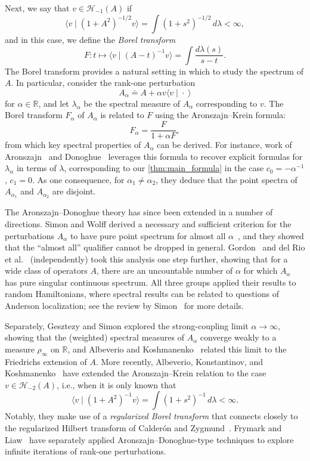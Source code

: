 \documentclass{cams-l} %
\newcommand{\dave}[1]{#1}\newcommand{\davebegin}{}\newcommand{\daveend}{}\newcommand{\george}[1]{#1}
\newcommand{\RR}{\mathbb R}
\newcommand{\cH}{\mathcal H}
\theoremstyle{definition}
\theoremstyle{remark}
\numberwithin{equation}{section}
\begin{document}
\dave{Next, we say that $v\in\cH_{-1}(A)$ if 
\[\langle v\;|\;(1 + A^2)^{-1/2}v\rangle = \int (1+s^2)^{-1/2}\,d\lambda < \infty,\]
and in this case, we define the \emph{Borel transform}
\[F:t\mapsto \langle v\;|\;(A-t)^{-1}v\rangle = \int\frac{d\lambda(s)}{s-t}.\]}
The Borel transform provides a natural setting in which to study the spectrum of $A$. In particular, consider the rank-one perturbation
\[A_\alpha\doteq A + \alpha v\langle v\;|\;\cdot\;\rangle\]
for $\alpha\in\RR$, and let $\lambda_\alpha$ be the spectral measure of $A_\alpha$ corresponding to $v$. The Borel transform $F_\alpha$ of $A_\alpha$ is related to $F$ using the Aronszajn--Krein formula:
\[F_\alpha = \frac{F}{1+\alpha F},\]
from which key spectral properties of $A_\alpha$ can be derived. For instance, work of Aronszajn~\cite{e48c169e-0374-3786-a618-5e3861c40257} and Donoghue~\cite{https://doi.org/10.1002/cpa.3160180402} leverages this formula to recover explicit formulas for $\lambda_\alpha$ in terms of $\lambda$, corresponding to our \cref{thm:main_formula} in the case $c_0=-\alpha^{-1}$, $c_1=0$. As one consequence, for $\alpha_1\neq\alpha_2$, they deduce that the point spectra of $A_{\alpha_1}$ and $A_{\alpha_2}$ are disjoint.

The Aronszajn--Donoghue theory has since been extended in a number of directions. Simon and Wolff derived a necessary and sufficient criterion for the perturbations $A_\alpha$ to have pure point spectrum for almost all $\alpha$~\cite{Simon1986SingularCS}, and they showed that the ``almost all'' qualifier cannot be dropped in general. Gordon~\cite{AYaGordon_1992,Gordon1994} and del Rio et al.~\cite{delrio1994singularcontinuousspectrumgeneric,Rio97} (independently) took this analysis one step further, showing that for a wide class of operators $A$, there \dave{are} an uncountable number of $\alpha$ for which $A_\alpha$ has pure singular continuous spectrum. All three groups applied their results to random Hamiltonians, where spectral results can be related to questions of Anderson localization; see the review by Simon~\cite{Simon97} for more details. 

Separately, Gesztezy and Simon explored the strong-coupling limit $\alpha\to\infty$, showing that the (weighted) spectral measures of $A_\alpha$ converge weakly to a measure $\rho_\infty$ on $\RR$, and Albeverio and Koshmanenko~\cite{Albeverio1999} related this limit to the Friedrichs extension of $A$. More recently, Albeverio, Konstantinov, and Koshmanenko~\cite{Albeverio2004} have extended the Aronszajn--Krein relation to the case $v\in\cH_{-2}(A)$, i.e., when it is only known that
\[\langle v\;|\;(1 + A^2)^{-1}v\rangle = \int (1+s^2)^{-1}\,d\lambda < \infty.\]
\dave{Notably, they make use of a \emph{regularized Borel transform} that connects closely to the regularized Hilbert transform of Calder\'on and Zygmund~\cite{10.1007/BF02392130}.} Frymark and Liaw~\cite{Frymark2019SpectralAO} have separately applied Aronszajn--Donoghue-type techniques to explore infinite iterations of rank-one perturbations.
\end{document}
